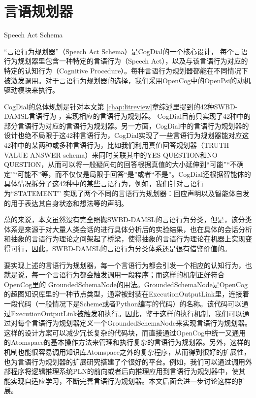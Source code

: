 \section{言语规划器}{Speech Act Schema}
\label{sec:SAS}

“言语行为规划器”（Speech Act Schema）是CogDial的一个核心设计， 每个言语行为规划器里包含一种特定的言语行为（Speech Act），以及与该言语行为对应的特定的认知行为（Cognitive Procedure）。每种言语行为规划器都能在不同情况下被激发调用。对于言语行为规划器的选择，我们采用OpenCog中的OpenPsi的动机驱动模块来执行。

    CogDial的总体规划是针对本文第 \ref{chap:litreview}章综述里提到的42种SWBD-DAMSL言语行为 \cite{Twitchell2004}，实现相应的言语行为规划器。 CogDial目前只实现了42种中的部分言语行为对应的言语行为规划器。另一方面，CogDial中的言语行为规划器的设计也绝不局限于这42种言语行为，CogDial实现了一些言语行为规划器能对应这42种中的某两种或多种言语行为，比如我们利用真值回答规划器（TRUTH VALUE ANSWER schema）来同时关联其中的YES QUESTION和NO QUESTION，从而可以将一般疑问句的回答根据真值的大小延伸到“可能”“不确定”“可能不”等，而不仅仅是局限于回答“是”或者“不是”。CogDial还根据智能体的具体情况拆分了这42种中的某些言语行为，例如，我们针对言语行为“STATEMENT” 实现了两个不同的言语行为规划器：回应声明以及智能体自发的用于表达其自身状态和想法等的声明。

总的来说，本文虽然没有完全照搬SWBD-DAMSL的言语行为分类，但是，该分类体系是来源于对大量人类会话的进行具体分析后的实验结果，也在具体的会话分析和抽象的言语行为理论之间架起了桥梁，使得抽象的言语行为理论在机器上实现变得可行，因此，SWBD-DAMSL的言语行为分类体系还是很有借鉴价值的。

要实现上述的言语行为规划器，每一个言语行为都会引发一个相应的认知行为，也就是说，每一个言语行为都会触发调用一段程序；而这样的机制正好符合OpenCog里的 GroundedSchemaNode的用法。GroundedSchemaNode是OpenCog的超图知识库里的一种节点类型，通常被封装在ExecutionOutputLink里，连接着一段代码（一般情况下是Scheme或者Python编写的代码）的名称。该代码可以通过ExecutionOutputLink被触发和执行。因此，鉴于这样的执行机制，我们可以通过对每个言语行为规划器定义一个GroundedSchemaNode来实现言语行为规划器。这样的设计方案可以减少冗长复杂的代码块，而直接通过OpenCog中统一又通用的Atomspace的基本操作方法来管理和执行复杂的言语行为规划器。另外，这样的机制也能很容易调用知识库Atomspace之外的复杂程序，从而得到很好的扩展性，也为言语行为规划器的扩展研究搭建了个很好的平台。例如，我们可以通过调用外部程序将逻辑推理系统PLN的前向或者后向推理应用到言语行为规划器中，使其能实现自适应学习，不断完善言语行为规划器。本文后面会进一步讨论这样的扩展。

